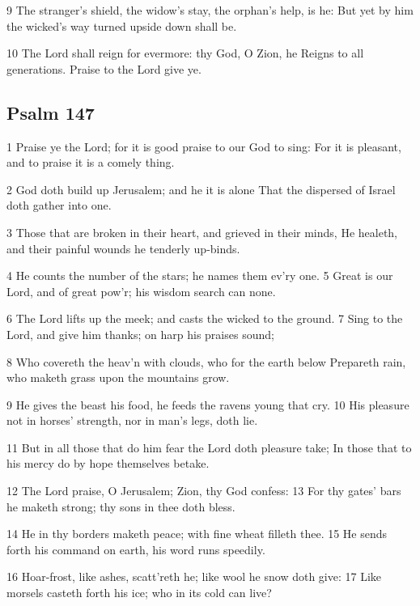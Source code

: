 9 The stranger’s shield, the widow’s stay,
the orphan’s help, is he:
But yet by him the wicked’s way
turned upside down shall be.

10 The Lord shall reign for evermore:
thy God, O Zion, he
Reigns to all generations.
Praise to the Lord give ye.

\begin{center}
\quad{}\quad{}
\end{center}

\subsection*{Psalm 147}

1 Praise ye the Lord; for it is good
praise to our God to sing:
For it is pleasant, and to praise
it is a comely thing.

2 God doth build up Jerusalem;
and he it is alone
That the dispersed of Israel
doth gather into one.

3 Those that are broken in their heart,
and grieved in their minds,
He healeth, and their painful wounds
he tenderly up-binds.

4 He counts the number of the stars;
he names them ev’ry one.
5 Great is our Lord, and of great pow’r;
his wisdom search can none.

6 The Lord lifts up the meek; and casts
the wicked to the ground.
7 Sing to the Lord, and give him thanks;
on harp his praises sound;

8 Who covereth the heav’n with clouds,
who for the earth below
Prepareth rain, who maketh grass
upon the mountains grow.

9 He gives the beast his food, he feeds
the ravens young that cry.
10 His pleasure not in horses’ strength,
nor in man’s legs, doth lie.

11 But in all those that do him fear
the Lord doth pleasure take;
In those that to his mercy do
by hope themselves betake.

12 The Lord praise, O Jerusalem;
Zion, thy God confess:
13 For thy gates’ bars he maketh strong;
thy sons in thee doth bless.

14 He in thy borders maketh peace;
with fine wheat filleth thee.
15 He sends forth his command on earth,
his word runs speedily.

16 Hoar-frost, like ashes, scatt’reth he;
like wool he snow doth give:
17 Like morsels casteth forth his ice;
who in its cold can live?

